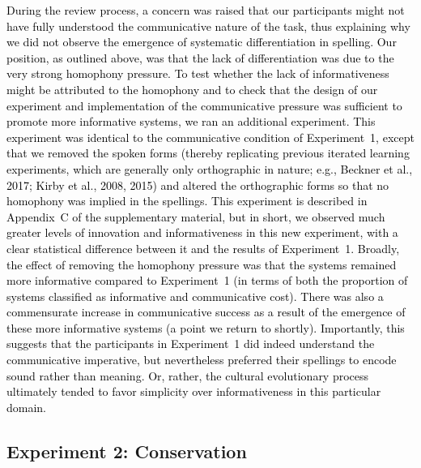 \documentclass[doc,biblatex]{apa7}
\newcommand\firstrevision[1]{\textcolor{black}{#1}}
\newcommand\secondrevision[1]{\textcolor{black}{#1}}
\begin{document}
\firstrevision{During the review process, a concern was raised that our participants might not have fully understood the communicative nature of the task, thus explaining why we did not observe the emergence of systematic differentiation in spelling. Our position, as outlined above, was that the lack of differentiation was due to the very strong homophony pressure. To test whether the lack of informativeness might be attributed to the homophony and to check that the design of our experiment and implementation of the communicative pressure was sufficient to promote more informative systems, we ran an additional experiment. This experiment was identical to the communicative condition of Experiment~1, except that we removed the spoken forms (thereby replicating previous iterated learning experiments, which are generally only orthographic in nature; e.g., Beckner et al., 2017; Kirby et al., 2008, 2015) and altered the orthographic forms so that no homophony was implied in the spellings. This experiment is described in Appendix~C of the supplementary material, but in short, we observed much greater levels of innovation and informativeness \secondrevision{in this new experiment, with a clear statistical difference between it and the results of Experiment~1. Broadly, the effect of removing the homophony pressure was that the systems remained more informative compared to Experiment~1 (in terms of both the proportion of systems classified as informative and communicative cost).} There was also a commensurate increase in communicative success as a result of the emergence of these more informative systems (a point we return to shortly). Importantly, this suggests that the participants in Experiment~1 did indeed understand the communicative imperative, but nevertheless preferred their spellings to encode sound rather than meaning. Or, rather, the cultural evolutionary process ultimately tended to favor simplicity over informativeness in this particular domain.}

\subsection{Experiment 2: Conservation}
\end{document}
